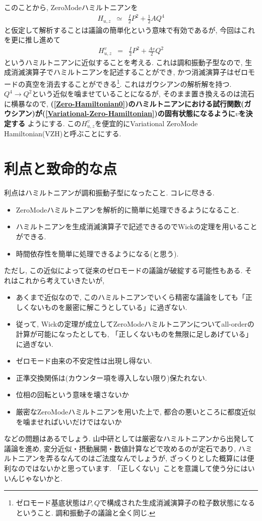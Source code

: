 \documentclass[10.5pt,a4paper]{jreport}
\begin{document}
このことから, ZeroModeハミルトニアンを
\begin{eqnarray}
  H_{u, z} &\simeq& \frac{I}{2}P^2 + \frac{1}{2}AQ^4\label{Zero-Hamiltonian0}
\end{eqnarray}
と仮定して解析することは議論の簡単化という意味で有効であるが, 今回はこれを更に推し進めて
\begin{eqnarray}
  H_{u, z}^v &=& \frac{I}{2}P^2 + \frac{Av}{2}Q^2\label{Variational-Zero-Hamiltonian}
\end{eqnarray}
というハミルトニアンに近似することを考える. これは調和振動子型なので, 生成消滅演算子でハミルトニアンを記述することができ, かつ消滅演算子はゼロモードの真空を消去することができる\footnote{ゼロモード基底状態は$P, Q$で構成された生成消滅演算子の粒子数状態になるということ. 調和振動子の議論と全く同じ. }. これはガウシアンの解析解を持つ. $Q^4\rightarrow Q^2$という近似を噛ませていることになるが, そのまま置き換えるのは流石に横暴なので, \textbf{(\ref{Zero-Hamiltonian0})のハミルトニアンにおける試行関数(ガウシアン)が(\ref{Variational-Zero-Hamiltonian})の固有状態になるように$v$を決定する }ようにする. この$H_{u, z}^v$を便宜的にVariational ZeroMode Hamiltonian(VZH)と呼ぶことにする. 
\section{利点と致命的な点}
利点はハミルトニアンが調和振動子型になったこと. コレに尽きる. 
\begin{itemize}
\item ZeroModeハミルトニアンを解析的に簡単に処理できるようになること.
\item ハミルトニアンを生成消滅演算子で記述できるのでWickの定理を用いることができる.
\item 時間依存性を簡単に処理できるようになる(と思う). 
\end{itemize}
ただし, この近似によって従来のゼロモードの議論が破綻する可能性もある. それはこれから考えていきたいが, 
\begin{itemize}
\item あくまで近似なので, このハミルトニアンでいくら精密な議論をしても「正しくないものを厳密に解こうとしている」に過ぎない.
\item 従って, Wickの定理が成立してZeroModeハミルトニアンについてall-orderの計算が可能になったとしても, 「正しくないものを無限に足しあげている」に過ぎない. 
\item ゼロモード由来の不安定性は出現し得ない. 
\item 正準交換関係は(カウンター項を導入しない限り)保たれない.
\item 位相の回転という意味を壊さないか
\item 厳密なZeroModeハミルトニアンを用いた上で, 都合の悪いところに都度近似を噛ませればいいだけではないか
\end{itemize}
などの問題はあるでしょう. 山中研としては厳密なハミルトニアンから出発して議論を進め, 変分近似・摂動展開・数値計算などで攻めるのが定石であり, ハミルトニアンを弄るなんてのはご法度なんでしょうが, ざっくりとした概算には便利なのではないかと思っています. 「正しくない」ことを意識して使う分にはいいんじゃないかと. 
\end{document}
